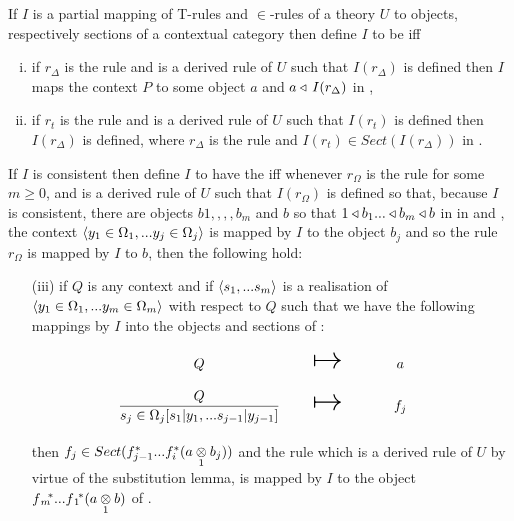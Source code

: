 \begin{definition}
\newcommand {\forceSOURCEwidth}{\rule{5cm}{0pt}}  %
\newcommand {\forceTARGETwidth}{\rule{2.2cm}{0pt}}
If $I$ is a partial mapping of T-rules and $\in$-rules of a theory $U$ to objects, respectively sections of a contextual category \catcw
then define $I$ to be  iff
\begin{enumerate}[(i)]
\item if $r_\Delta$ is the rule  and is a derived rule of $U$
such that $I(r_\Delta)$ is defined 
then $I$ maps the context $P$ to some object $a$ and $a \base\, I(r_\Delta)$ in \catc,
\item if $r_t$ is the rule  and is a derived rule of $U$ 
such that $I(r_t)$ is defined 
then $I(r_\Delta)$
is defined, where $r_\Delta$ is the rule   and $I(r_t) \in Sect(I(r_\Delta))$ in \catc.
\end{enumerate}
If $I$ is consistent then define $I$ to have the  iff 
whenever $r_\Omega$ is the rule \omegarule[,] for some $m \geq 0$, and is a derived rule of $U$ 
such that $I(r_\Omega)$ is defined
so that, because $I$ is consistent,
there are objects $b1,,,,b_m$ and $b$ so  that $1 \base b_1 ... \base b_m \base b$ in
in \catcw and \foreachj, the context $\encyOmega{j}$  is mapped by $I$ to the object $b_j$ and 
so the rule $r_\Omega$ is mapped by $I$ to $b$, 
then the following hold:
\begin{enumerate}
\item [(iii)] 
if $Q$ is any context and if $\tuple{\sm}$ is a realisation of $\tuple{\yOmega{m}}$ with respect to $Q$
such that we have the following mappings by $I$ into the objects and sections of \catc:
\begin{equation*}
\begin{array}{c c c}
\forceSOURCEwidth & & \forceTARGETwidth \\ [-0.1cm]
Q          & \Imapsto & a   \\ [0.4cm]
\sjrule    & \Imapsto & f_j \\ [0.4cm]
\end{array}
\end{equation*}
then $f_j \in Sect(f_{j-1}^*...f_i^*(\crossx{a}{b_j}{1}))$
and the rule \omegarulesubstituted[,] which is a derived rule of $U$ by virtue of the substitution lemma, is mapped by $I$ 
to the object $\fmstar...\fonestar (\crossx{a}{b}{1})$ of \catc.


\end{enumerate}
\end{definition}

